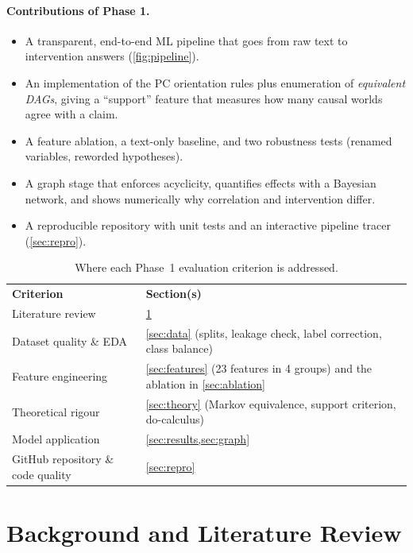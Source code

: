 \documentclass[11pt,a4paper]{article}
\newcommand{\thead}[1]{\leavevmode\sffamily\bfseries\color{white}#1}
\newcommand{\headrow}{\rowcolor{ink}}
\begin{document}
\paragraph{Contributions of Phase 1.}
\begin{itemize}
  \item A transparent, end-to-end ML pipeline that goes from raw text to intervention answers (\cref{fig:pipeline}).
  \item An implementation of the PC orientation rules plus enumeration of \emph{equivalent DAGs}, giving a
        ``support'' feature that measures how many causal worlds agree with a claim.
  \item A feature ablation, a text-only baseline, and two robustness tests (renamed variables, reworded hypotheses).
  \item A graph stage that enforces acyclicity, quantifies effects with a Bayesian network, and shows numerically
        why correlation and intervention differ.
  \item A reproducible repository with unit tests and an interactive pipeline tracer (\cref{sec:repro}).
\end{itemize}

\begin{table}[!htbp]
\centering\small
\caption{Where each Phase~1 evaluation criterion is addressed.}
\label{tab:rubric}
\begin{tabularx}{0.92\linewidth}{@{}lX@{}}
\headrow \thead{Criterion} & \thead{Section(s)} \\
Literature review & \cref{sec:lit} \\
\rowcolor{mist} Dataset quality \& EDA & \cref{sec:data} (splits, leakage check, label correction, class balance) \\
Feature engineering & \cref{sec:features} (23 features in 4 groups) and the ablation in \cref{sec:ablation} \\
\rowcolor{mist} Theoretical rigour & \cref{sec:theory} (Markov equivalence, support criterion, do-calculus) \\
Model application & \cref{sec:results,sec:graph} \\
\rowcolor{mist} GitHub repository \& code quality & \cref{sec:repro} \\
\end{tabularx}
\end{table}

\section{Background and Literature Review}\label{sec:lit}
\end{document}
